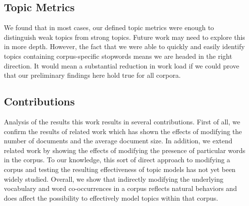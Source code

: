 \documentclass[letterpaper, 10 pt, conference]{ieeeconf}  %
\begin{document}
\subsection{Topic Metrics}
We found that in most cases, our defined topic metrics were enough to distinguish weak topics from strong topics. Future work may need to explore this in more depth. However, the fact that we were able to quickly and easily identify topics containing corpus-specific stopwords means we are headed in the right direction. It would mean a substantial reduction in work load if we could prove that our preliminary findings here hold true for all corpora.

\subsection{Contributions}
Analysis of the results this work results in several contributions. First of all, we confirm the results of related work which has shown the effects of modifying the number of documents and the average document size. In addition, we extend related work by showing the effects of modifying the presence of particular words in the corpus. To our knowledge, this sort of direct approach to modifying a corpus and testing the resulting effectiveness of topic models has not yet been widely studied. Overall, we show that indirectly modifying the underlying vocabulary and word co-occurrences in a corpus reflects natural behaviors and does affect the possibility to effectively model topics within that corpus.

\addtolength{\textheight}{-12cm}   %







\end{document}
